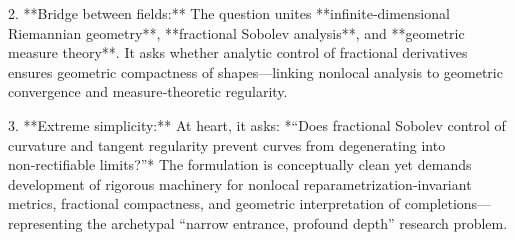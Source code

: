 2. **Bridge between fields:**  
   The question unites **infinite‑dimensional Riemannian geometry**, **fractional Sobolev analysis**, and **geometric measure theory**.  It asks whether analytic control of fractional derivatives ensures geometric compactness of shapes—linking nonlocal analysis to geometric convergence and measure‑theoretic regularity.

3. **Extreme simplicity:**  
   At heart, it asks:  
   *“Does fractional Sobolev control of curvature and tangent regularity prevent curves from degenerating into non‑rectifiable limits?”*  
   The formulation is conceptually clean yet demands development of rigorous machinery for nonlocal reparametrization‑invariant metrics, fractional compactness, and geometric interpretation of completions—representing the archetypal “narrow entrance, profound depth” research problem.